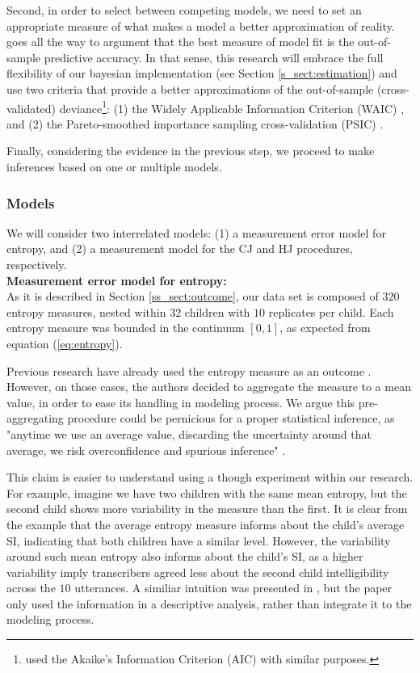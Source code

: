 Second, in order to select between competing models, we need to set an appropriate measure of what makes a model a better approximation of reality. \citet{McElreath_2020} goes all the way to argument that the best measure of model fit is the out-of-sample predictive accuracy. In that sense, this research will embrace the full flexibility of our bayesian implementation (see Section \ref{s_sect:estimation}) and use two criteria that provide a better approximations of the out-of-sample (cross-validated) deviance\footnote{\citet{vanDaal_2020} used the Akaike’s Information Criterion (AIC) \citep{Akaike_1974} with similar purposes.}: (1) the Widely Applicable Information Criterion (WAIC) \citep{Watanabe_2013}, and (2) the Pareto-smoothed importance sampling cross-validation (PSIC) \citep{Vehtari_et_al_2021}. 

Finally, considering the evidence in the previous step, we proceed to make inferences based on one or multiple models.
%
%
\subsubsection{Models}
%
We will consider two interrelated models: (1) a measurement error model for entropy, and (2) a measurement model for the CJ and HJ procedures, respectively. \\

\noindent \textbf{Measurement error model for entropy:} \\
%
As it is described in Section \ref{ss_sect:outcome}, our data set is composed of $320$ entropy measures, nested within $32$ children with $10$ replicates per child. Each entropy measure was bounded in the continuum $[0,1]$, as expected from equation (\ref{eq:entropy}).

Previous research have already used the entropy measure as an outcome \citep{Boonen_et_al_2021, Faes_et_al_2021}. However, on those cases, the authors decided to aggregate the measure to a mean value, in order to ease its handling in modeling process. We argue this pre-aggregating procedure could be pernicious for a proper statistical inference, as "anytime we use an average value, discarding the uncertainty around that average, we risk overconfidence and spurious inference" \citep{McElreath_2020}. 

This claim is easier to understand using a though experiment within our research. For example, imagine we have two children with the same mean entropy, but the second child shows more variability in the measure than the first. It is clear from the example that the average entropy measure informs about the child's average SI, indicating that both children have a similar level. However, the variability around such mean entropy also informs about the child's SI, as a higher variability imply transcribers agreed less about the second child intelligibility across the $10$ utterances. A similiar intuition was presented in \citet{Boonen_et_al_2021}, but the paper only used the information in a descriptive analysis, rather than integrate it to the modeling process. 

